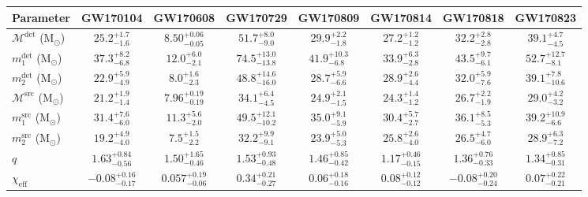 \begin{table}[t]
\begin{adjustwidth}{-1.5cm}{}
\setlength{\tabcolsep}{3pt}
\centering\begin{tabular}{lccccccc} 
\hline
\rule{0pt}{3ex}%
Parameter & GW170104 & GW170608 & GW170729 & GW170809 & GW170814 & GW170818 & GW170823 \\
\hline\hline
\rule{0pt}{3ex}%
\vspace*{0.1cm}
$\mathcal{M}^{\mathrm{det}}$ (M$_{\odot}$) & $25.2^{+1.7}_{-1.6}$ & $8.50^{+0.06}_{-0.05}$ & $51.7^{+8.0}_{-9.0}$ & $29.9^{+2.2}_{-1.8}$ & $27.2^{+1.2}_{-1.2}$ & $32.2^{+2.8}_{-2.8}$ & $39.1^{+4.7}_{-4.5}$ \\
\vspace*{0.1cm}
$m_1^{\mathrm{det}}$ (M$_{\odot}$) & $37.3^{+8.2}_{-6.8}$ & $12.0^{+6.0}_{-2.1}$ & $74.5^{+13.0}_{-13.8}$ & $41.9^{+10.3}_{-6.8}$ & $33.9^{+6.3}_{-2.8}$ & $43.5^{+9.7}_{-6.1}$ & $52.7^{+12.7}_{-8.1}$ \\
\vspace*{0.1cm}
$m_2^{\mathrm{det}}$ (M$_{\odot}$) & $22.9^{+5.9}_{-4.9}$ & $8.0^{+1.6}_{-2.3}$ & $48.8^{+14.6}_{-16.0}$ & $28.7^{+5.9}_{-6.6}$ & $28.9^{+2.6}_{-4.4}$ & $32.0^{+5.9}_{-7.6}$ & $39.1^{+7.8}_{-10.6}$ \\
\vspace*{0.1cm}
$\mathcal{M}^{\mathrm{src}}$ (M$_{\odot}$) & $21.2^{+1.9}_{-1.4}$ & $7.96^{+0.19}_{-0.19}$ & $34.1^{+6.4}_{-4.5}$ & $24.9^{+2.1}_{-1.5}$ & $24.3^{+1.4}_{-1.2}$ & $26.7^{+2.2}_{-1.9}$ & $29.0^{+4.2}_{-3.2}$ \\
\vspace*{0.1cm}
$m_1^{\mathrm{src}}$ (M$_{\odot}$) & $31.4^{+7.6}_{-6.0}$ & $11.3^{+5.6}_{-2.0}$ & $49.5^{+12.1}_{-10.2}$ & $35.0^{+9.1}_{-5.9}$ & $30.4^{+5.7}_{-2.7}$ & $36.1^{+8.5}_{-5.3}$ & $39.2^{+10.9}_{-6.6}$ \\
\vspace*{0.1cm}
$m_2^{\mathrm{src}}$ (M$_{\odot}$) & $19.2^{+4.9}_{-4.0}$ & $7.5^{+1.5}_{-2.2}$ & $32.2^{+9.9}_{-9.1}$ & $23.9^{+5.0}_{-5.3}$ & $25.8^{+2.6}_{-4.0}$ & $26.5^{+4.7}_{-6.0}$ & $28.9^{+6.3}_{-7.2}$ \\
\vspace*{0.1cm}
$q$ & $1.63^{+0.84}_{-0.56}$ & $1.50^{+1.65}_{-0.46}$ & $1.53^{+0.93}_{-0.48}$ & $1.46^{+0.85}_{-0.42}$ & $1.17^{+0.46}_{-0.15}$ & $1.36^{+0.76}_{-0.33}$ & $1.34^{+0.85}_{-0.31}$ \\
\vspace*{0.1cm}
$\chi_{\mathrm{eff}}$ & $-0.08^{+0.16}_{-0.17}$ & $0.057^{+0.19}_{-0.06}$ & $0.34^{+0.21}_{-0.27}$ & $0.06^{+0.18}_{-0.16}$ & $0.08^{+0.12}_{-0.12}$ & $-0.08^{+0.20}_{-0.24}$ & $0.07^{+0.22}_{-0.21}$ \\

\end{tabular}
\end{adjustwidth}
\end{table}
